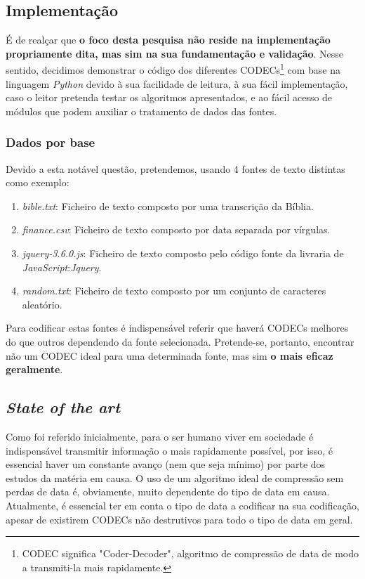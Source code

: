 \documentclass[12pt,journal,compsoc]{IEEEtran}
\begin{document}
\subsection{Implementação}


É de realçar que \textbf{o foco desta pesquisa não reside na implementação propriamente dita, mas sim na sua fundamentação e validação}. Nesse sentido, decidimos demonstrar o código dos diferentes CODECs\footnote{CODEC significa "Coder-Decoder", algoritmo de compressão de data de modo a transmiti-la mais rapidamente.} com base na linguagem \textit{Python} devido à sua facilidade de leitura, à sua fácil implementação, caso o leitor pretenda testar os algoritmos apresentados, e ao fácil acesso de módulos que podem auxiliar o tratamento de dados das fontes.

\IEEEpubidadjcol

\subsubsection{Dados por base}
Devido a esta notável questão, pretendemos, usando 4 fontes de texto distintas como exemplo:

\begin{enumerate}
    \item \textit{bible.txt}: Ficheiro de texto composto por uma transcrição da Bíblia.
    \item \textit{finance.csv}: Ficheiro de texto composto por data separada por vírgulas.
    \item \textit{jquery-3.6.0.js}: Ficheiro de texto composto pelo código fonte da livraria de \textit{JavaScript}:\textit{Jquery}.
    \item \textit{random.txt}: Ficheiro de texto composto por um conjunto de caracteres aleatório.
\end{enumerate}

Para codificar estas fontes é indispensável referir que haverá CODECs melhores do que outros dependendo da fonte selecionada. Pretende-se, portanto, encontrar não um CODEC ideal para uma determinada fonte, mas sim \textbf{o mais eficaz geralmente}. 

\subsection{\textit{State of the art}}
Como foi referido inicialmente, para o ser humano viver em sociedade é indispensável transmitir informação o mais rapidamente possível, por isso, é essencial haver um constante avanço (nem que seja mínimo) por parte dos estudos da matéria em causa. O uso de um algoritmo ideal de compressão sem perdas de data é, obviamente, muito dependente do tipo de data em causa.
Atualmente, é essencial ter em conta o tipo de data a codificar na sua codificação, apesar de existirem CODECs não destrutivos para todo o tipo de data em geral.
\end{document}
